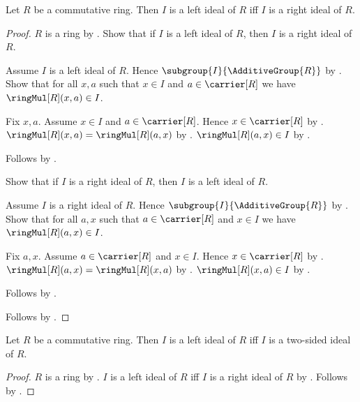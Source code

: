 \begin{theorem}\label{commutative_left_ideal_iff_right_ideal}
    Let $R$ be a commutative ring.
    Then $I$ is a left ideal of $R$ iff $I$ is a right ideal of $R$.
\end{theorem}
\begin{proof}
    $R$ is a ring by .
    Show that if $I$ is a left ideal of $R$, then
        $I$ is a right ideal of $R$.
    \begin{subproof}
        Assume $I$ is a left ideal of $R$.
        Hence $\subgroup{I}{\AdditiveGroup{R}}$ by
            .
        Show that for all $x,a$ such that $x\in I$ and
            $a\in\carrier[R]$ we have $\ringMul[R](x,a)\in I$.
        \begin{subproof}
            Fix $x,a$.
            Assume $x\in I$ and $a\in\carrier[R]$.
            Hence $x\in\carrier[R]$ by
                .
            $\ringMul[R](x,a)=\ringMul[R](a,x)$ by
                .
            $\ringMul[R](a,x)\in I$ by
                .
        \end{subproof}
        Follows by .
    \end{subproof}
    Show that if $I$ is a right ideal of $R$, then
        $I$ is a left ideal of $R$.
    \begin{subproof}
        Assume $I$ is a right ideal of $R$.
        Hence $\subgroup{I}{\AdditiveGroup{R}}$ by
            .
        Show that for all $a,x$ such that $a\in\carrier[R]$ and
            $x\in I$ we have $\ringMul[R](a,x)\in I$.
        \begin{subproof}
            Fix $a,x$.
            Assume $a\in\carrier[R]$ and $x\in I$.
            Hence $x\in\carrier[R]$ by
                .
            $\ringMul[R](a,x)=\ringMul[R](x,a)$ by
                .
            $\ringMul[R](x,a)\in I$ by
                .
        \end{subproof}
        Follows by .
    \end{subproof}
    Follows by \auto.
\end{proof}

\begin{theorem}\label{commutative_left_ideal_iff_two_sided_ideal}
    Let $R$ be a commutative ring.
    Then $I$ is a left ideal of $R$ iff
        $I$ is a two-sided ideal of $R$.
\end{theorem}
\begin{proof}
    $R$ is a ring by .
    $I$ is a left ideal of $R$ iff $I$ is a right ideal of $R$ by
        .
    Follows by .
\end{proof}

